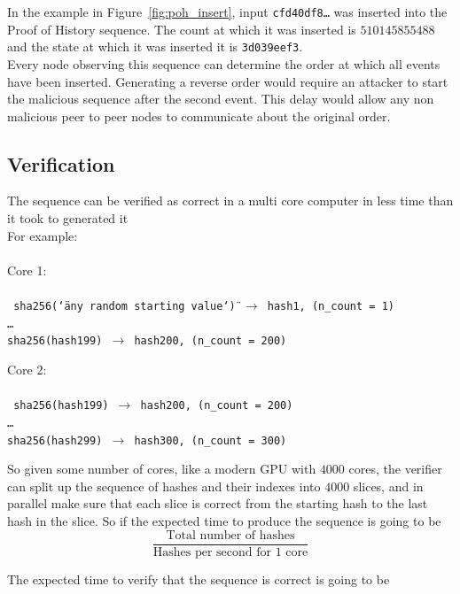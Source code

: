 \documentclass[12pt]{article}
\begin{document}
  In the example in Figure~\ref{fig:poh_insert}, input \texttt{cfd40df8\ldots} was inserted into the Proof of History sequence. The count at which it was inserted is $510145855488$ and the state at which it was inserted it is \texttt{3d039eef3}.\\

Every node observing this sequence can determine the order at which all events have been inserted. Generating a reverse order would require an attacker to start the malicious sequence after the second event. This delay would allow any non malicious peer to peer nodes to communicate about the original order.\\

\subsection{Verification}
The sequence can be verified as correct in a multi core computer in less time than it took to generated it \\

\noindent For example: \\\\\noindent
\noindent Core 1: \\\\\noindent
\texttt{
sha256(\char`\"any random starting value\char`\") $\rightarrow$ hash1, (n\_count = 1)\\
\ldots\\
sha256(hash199) $\rightarrow$ hash200, (n\_count = 200)\\
}

\noindent Core 2: \\\\\noindent
\texttt{
sha256(hash199) $\rightarrow$ hash200, (n\_count = 200)\\
\ldots\\
sha256(hash299) $\rightarrow$ hash300, (n\_count = 300)\\
}

So given some number of cores, like a modern GPU with $4000$ cores, the verifier can split up the sequence of hashes and their indexes into $4000$ slices, and in parallel make sure that each slice is correct from the starting hash to the last hash in the slice. So if the expected time to produce the sequence is going to be\\


\[
\frac{\textrm{Total number of hashes}}{\textrm{Hashes per second for 1 core}}
\]

\noindent The expected time to verify that the sequence is correct is going to be \\
\end{document}
